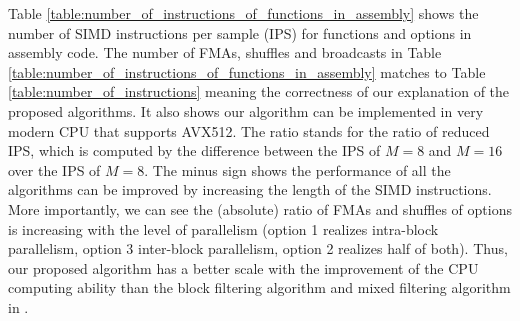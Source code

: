 Table \ref{table:number_of_instructions_of_functions_in_assembly} shows the number of SIMD instructions
per sample (IPS) for functions and options in assembly code. 
The number of FMAs, shuffles and broadcasts in Table \ref{table:number_of_instructions_of_functions_in_assembly}
matches to Table \ref{table:number_of_instructions} meaning the correctness of our explanation of the proposed algorithms.
It also shows our algorithm can be implemented in very modern CPU that supports AVX512.
The ratio stands for the ratio of reduced IPS, which is computed by the 
difference between the IPS of $M{=}8$ and $M{=}16$ over the IPS of $M{=}8$.
The minus sign shows the performance of all the algorithms can be improved by increasing the length of the SIMD instructions.
More importantly, we can see the (absolute) ratio of FMAs and shuffles of options is increasing with the level of parallelism
(option 1 realizes intra-block parallelism, option 3 inter-block parallelism, option 2 realizes half of both).
Thus, our proposed algorithm has a better scale with the improvement of the CPU computing ability
than the block filtering algorithm and mixed filtering algorithm in \cite{Jaewoo_09}.


